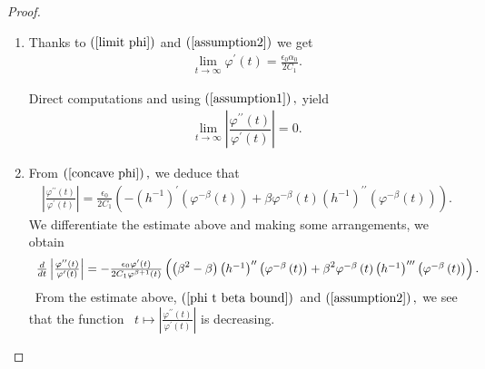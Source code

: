 \documentclass[11pt,reqno]{amsart}
\theoremstyle{plain}
\numberwithin{equation}{section}
\numberwithin{equation}{section}
\begin{document}
\begin{proof}
\begin{enumerate}
\item Thanks to $\left( \ref{limit phi}\right) $ and $\left( \ref%
{assumption2}\right) $ we get 
\begin{equation}
\begin{array}{c}
\underset{t\rightarrow \infty }{\lim }\varphi ^{\prime }\left( t\right) =%
\frac{\epsilon _{0}\alpha _{0}}{2C_{1}}.%
\end{array}
\label{limit phi derivative}
\end{equation}

Direct computations and using $\left( \ref{assumption1}\right) ,$ yield%
\begin{equation*}
\begin{array}{c}
\underset{t\rightarrow \infty }{\lim }\left\vert \dfrac{\varphi ^{\prime
\prime }\left( t\right) }{\varphi ^{\prime }\left( t\right) }\right\vert =0.%
\end{array}%
\end{equation*}

\item From $\left( \ref{concave phi}\right) ,$ we deduce that%
\begin{equation*}
\begin{array}{c}
\left\vert \frac{\varphi ^{\prime \prime }\left( t\right) }{\varphi ^{\prime
}\left( t\right) }\right\vert =\frac{\epsilon _{0}}{2C_{1}}\left( -\left(
h^{-1}\right) ^{\prime }\left( \varphi ^{-\beta }\left( t\right) \right)
+\beta \varphi ^{-\beta }\left( t\right) \left( h^{-1}\right) ^{\prime
\prime }\left( \varphi ^{-\beta }\left( t\right) \right) \right) .%
\end{array}%
\end{equation*}%
We differentiate the estimate above and making some arrangements, we obtain%
\begin{equation*}
\begin{array}{c}
\frac{d}{dt}\left\vert \frac{\varphi ^{\prime \prime }\left( t\right) }{%
\varphi ^{\prime }\left( t\right) }\right\vert =-\frac{\epsilon _{0}\varphi
^{\prime }\left( t\right) }{2C_{1}\varphi ^{\beta +1}\left( t\right) }\left(
\left( \beta ^{2}-\beta \right) \left( h^{-1}\right) ^{\prime \prime }\left(
\varphi ^{-\beta }\left( t\right) \right) +\beta ^{2}\varphi ^{-\beta
}\left( t\right) \left( h^{-1}\right) ^{\prime \prime \prime }\left( \varphi
^{-\beta }\left( t\right) \right) \right) .%
\end{array}%
\end{equation*}%
\ From the estimate above, $\left( \ref{phi t beta bound}\right) $\ and $%
\left( \ref{assumption2}\right) ,$ we see that the function \ $t\longmapsto
\left\vert \frac{\varphi ^{\prime \prime }\left( t\right) }{\varphi ^{\prime
}\left( t\right) }\right\vert $ is decreasing.


\end{enumerate}
\end{proof}
\end{document}
